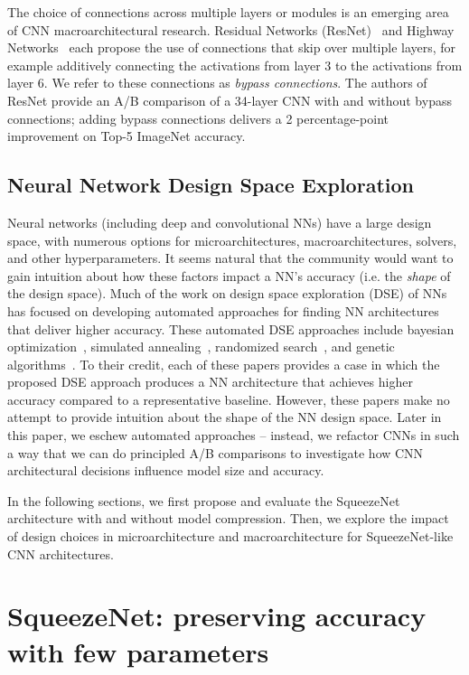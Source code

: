 \documentclass{article} \usepackage{iclr2017_conference,times}
\renewcommand{\cite}{\citep}
\def\vsp{\vspace{-0.15in}}
\begin{document}
The choice of connections across multiple layers or modules is an emerging area of CNN macroarchitectural research.
Residual Networks (ResNet)~\cite{resnet} and Highway Networks~\cite{highway-networks} each propose the use of connections that skip over multiple layers, for example additively connecting the activations from layer 3 to the activations from layer 6.
We refer to these connections as {\em bypass connections}.
The authors of ResNet provide an A/B comparison of a 34-layer CNN with and without bypass connections; adding bypass connections delivers a 2 percentage-point improvement on Top-5 ImageNet accuracy.


\subsection{Neural Network Design Space Exploration}
\vsp

Neural networks (including deep and convolutional NNs) have a large design space, with numerous options for microarchitectures, macroarchitectures, solvers, and other hyperparameters.
It seems natural that the community would want to gain intuition about how these factors impact a NN's accuracy (i.e. the {\em shape} of the design space).
Much of the work on design space exploration (DSE) of NNs has focused on developing automated approaches for finding NN architectures that deliver higher accuracy.
These automated DSE approaches include bayesian optimization~\cite{spearmint-paper}, simulated annealing~\cite{simulated-annealing}, randomized search~\cite{randomized-search}, and genetic algorithms~\cite{genetic-algorithms}.
To their credit, each of these papers provides a case in which the proposed DSE approach produces a NN architecture that achieves higher accuracy compared to a representative baseline.
However, these papers make no attempt to provide intuition about the shape of the NN design space.
Later in this paper, we eschew automated approaches -- instead, we refactor CNNs in such a way that we can do principled A/B comparisons to investigate how CNN architectural decisions influence model size and accuracy.

In the following sections, we first propose and evaluate the SqueezeNet architecture with and without model compression. 
Then, we explore the impact of design choices in microarchitecture and macroarchitecture for SqueezeNet-like CNN architectures.

\section{SqueezeNet: preserving accuracy with few parameters}
\label{sec:SqueezeNet}
\vsp
\end{document}
